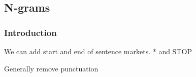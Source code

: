 
\subsection{N-grams}
\subsubsection{Introduction}

We can add start and end of sentence markets. * and STOP

Generally remove punctuation

